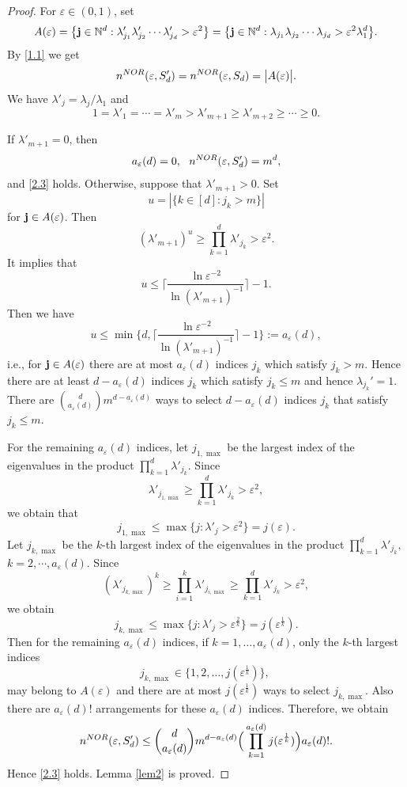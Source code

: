 \documentclass[10pt,a4paper]{amsart}
\numberwithin{equation}{section}
\def\vz{\varepsilon}
\def\lz{\lambda}
\newcommand{\NN}{\mathbb{N}}
\newcommand{\bsj}{\oldsymbol{j}}
\def\NN{{\mathbb N}}
\def\bsj{{\bf j}}
\begin{document}
\begin{proof}
For $\vz\in(0,1)$, set $$A(\vz)=\big\{\bsj \in \NN^d :
\lambda'_{j_1} \lambda'_{j_2}\cdots  \lambda'_{j_d}> \varepsilon^2
\big\}=\big\{\bsj \in \NN^d : \lambda_{j_1} \lambda_{j_2}\cdots
\lambda_{j_d}> \varepsilon^2 \lz_1^{d}\big\}.$$ By \eqref{1.1}
we get
$$n^{\rm NOR}(\vz,S'_d)=n^{\rm NOR}(\vz,S_d)= \big|A(\vz)\big|.$$
 We have $\lz'_j=\lz_j/\lz_1$ and
$$1=\lz'_1=\cdots=\lz'_m>\lz'_{m+1}\ge\lz'_{m+2}\ge\cdots\ge0.$$

If $\lz'_{m+1}=0$, then $$a_{\vz}(d)=0, \ \ n^{\rm
NOR}(\vz,S'_d)=m^d,$$ and \eqref{2.3} holds. Otherwise, suppose
that $\lz'_{m+1}>0$. Set $$u=|\{k\in [d] : j_k>m\}|$$ for $\bsj\in
A(\vz)$. Then
$$(\lz'_{m+1})^{u} \ge\prod_{k=1}^d\lambda'_{j_k}>\vz^2.$$
It implies that
$$u\le \big\lceil\frac{\ln\vz^{-2}}{\ln(\lambda'_{m+1})^{-1}}\big\rceil-1.$$
Then we have
\begin{equation*}
u\le \min\big\{d,
\big\lceil\frac{\ln\vz^{-2}}{\ln(\lambda'_{m+1})^{-1}}\big\rceil-1\big\}:=a_{\vz}(d),
\end{equation*}i.e., for $\bsj\in
A(\vz)$ there are at most $a_{\vz}(d)$ indices $j_k$ which satisfy
$j_k>m$. Hence there are at least $d-a_{\vz}(d)$ indices $j_k$
which satisfy $j_k\le m$ and hence $\lz_{j_k}'=1$.  There are
$\binom{d}{a_{\vz}(d)}m^{d-a_{\vz}(d)}$ ways to select $d-a_{\vz}(d)$
indices $j_k$ that satisfy $j_k\le m$.

For the remaining $a_{\vz}(d)$ indices, let $j_{1,\max}$ be the
largest index of the eigenvalues in the product
$\prod\limits_{k=1}^d\lambda'_{j_k}$. Since
$$\lambda'_{j_{1,\max}}\ge   \prod\limits_{k=1}^d\lambda'_{j_k}>\vz^2,$$
we obtain that
$$j_{1,\max}\le \max\big\{j:\lambda'_j>{\vz^2}\big\}
=j(\vz).$$ Let $j_{k,\max}$ be the $k$-th largest index of the
eigenvalues in the product $\prod\limits_{k=1}^d\lambda'_{j_k},$
$k=2,\cdots,a_\vz(d)$. Since
$$ (\lambda'_{j_{k,\max}})^k\ge \prod_{i=1}^k \lambda'_{j_{i,\max}}\ge  \prod_{k=1}^d\lambda'_{j_k}
>\vz^2,$$
we obtain
\begin{equation*}
j_{k,\max}\le \max\big\{j:\lambda'_j>\vz^{\frac{2}{k}}\big\} =j(\vz^{\frac{1}{k}})
.
\end{equation*}
Then for the remaining $a_{\vz}(d)$ indices, if $k=1,\dots,
a_\vz(d)$, only the $k$-th largest indices
$$j_{k,\max}\in\big\{1, 2, \dots, j(\vz^{\frac{1}{k}})\big\},\
$$ may belong to $A(\vz)$ and there are at most $j(\vz^{\frac{1}{k}})$ ways to select $j_{k,\max}$.
Also there are  $a_{\vz}(d)!$ arrangements for these $a_{\vz}(d)$
indices. Therefore, we obtain
$$n^{\rm NOR}(\vz,S_d')\le
\binom{d}{a_{\vz}(d)}m^{d-a_{\vz}(d)}
\Big(\prod_{k=1}^{a_{\vz}(d)}j(\vz^{\frac{1}{k}})\Big)
a_{\vz}(d)!.
$$
Hence \eqref{2.3} holds. Lemma \ref{lem2} is proved.
\end{proof}
\end{document}
